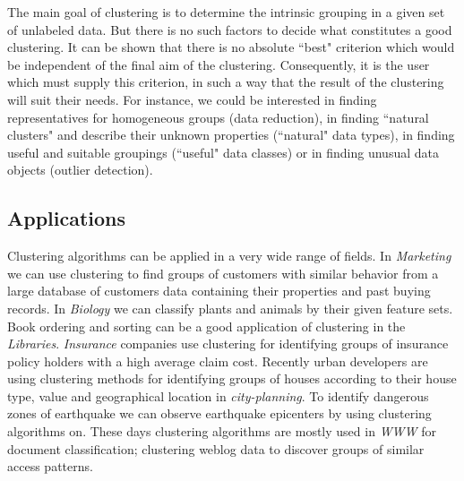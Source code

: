 The main goal of clustering is to determine the intrinsic grouping in a given set of unlabeled data.
But there is no such factors to decide what constitutes a good clustering. It can be shown that there is no
absolute ``best" criterion which would be independent of the final aim of the clustering. Consequently, it is the user
which must supply this criterion, in such a way that the result of the clustering will suit their needs.
For instance, we could be interested in finding representatives for homogeneous groups (data reduction),
in finding ``natural clusters" and describe their unknown properties (``natural" data types),
in finding useful and suitable groupings (``useful" data classes) or in finding unusual data objects (outlier detection).

\subsection{Applications}
Clustering algorithms can be applied in a very wide range of fields. In \textit{Marketing} we can use clustering
to find groups of customers with similar behavior from a large database of customers data containing their properties
and past buying records. In \textit{Biology} we can classify plants and animals by their given feature sets. Book
ordering and sorting can be a good application of clustering in the \textit{Libraries}. \textit{Insurance} companies
use clustering for identifying groups of insurance policy holders with a high average claim cost.
Recently urban developers are using clustering methods for identifying groups
of houses according to their house type, value and geographical location in \textit{city-planning}. To identify
dangerous zones of earthquake we can observe earthquake epicenters by using clustering algorithms on. These days
clustering algorithms are mostly used in \textit{WWW} for document classification;
clustering weblog data to discover groups of similar access patterns.

